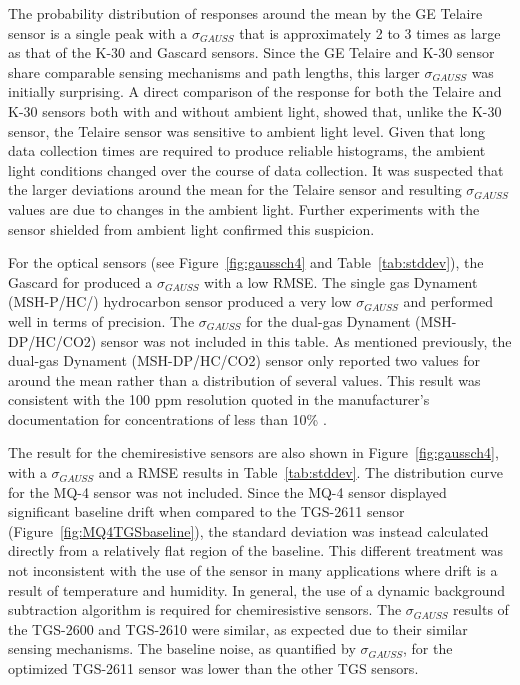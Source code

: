 \documentclass[sensors,article,submit,moreauthors,pdftex]{Definitions/mdpi}
\begin{document}
			
			The probability distribution of responses around the mean by the GE Telaire sensor is a single peak with a $\sigma_{GAUSS}$ that is approximately 2 to 3 times as large as that of the K-30 and Gascard sensors.
			Since the GE Telaire and K-30 sensor share comparable sensing mechanisms and path lengths, this larger $\sigma_{GAUSS}$ was initially surprising.
			A direct comparison of the response for both the Telaire and K-30 sensors both with and without ambient light, showed that, unlike the K-30 sensor, the Telaire sensor was sensitive to ambient light level.
			Given that long data collection times are required to produce reliable histograms, the ambient light conditions changed over the course of data collection.
			It was suspected that the larger deviations around the mean for the Telaire sensor and resulting $\sigma_{GAUSS}$ values are due to changes in the ambient light.
			Further experiments with the sensor shielded from ambient light confirmed this suspicion.
			
			
			For the optical  sensors (see Figure~\ref{fig:gaussch4} and Table~\ref{tab:stddev}), the Gascard for  produced a $\sigma_{GAUSS}$ with a low RMSE.
			The single gas Dynament (MSH-P/HC/) hydrocarbon sensor produced a very low $\sigma_{GAUSS}$ and performed well in terms of precision.
			The $\sigma_{GAUSS}$ for the dual-gas Dynament (MSH-DP/HC/CO2) sensor was not included in this table.
			As mentioned previously, the dual-gas Dynament (MSH-DP/HC/CO2) sensor only reported two values for  around the mean rather than a distribution of several values.
			This result was consistent with the 100 ppm resolution quoted in the manufacturer's documentation for concentrations of less than 10\% .
			

			The result for the chemiresistive  sensors are also shown in Figure~\ref{fig:gaussch4}, with a $\sigma_{GAUSS}$ and a RMSE results in Table~\ref{tab:stddev}.
			The distribution curve for the MQ-4 sensor was not included.
			Since the MQ-4 sensor displayed significant baseline drift when compared to the TGS-2611 sensor (Figure~\ref{fig:MQ4TGSbaseline}), the standard deviation was instead calculated directly from a relatively flat region of the baseline.
			This different treatment was not inconsistent with the use of the sensor in many applications where drift is a result of temperature and humidity.
			In general, the use of a dynamic background subtraction algorithm is required for chemiresistive sensors.
			The $\sigma_{GAUSS}$ results of the TGS-2600 and TGS-2610 were similar, as expected due to their similar sensing mechanisms.
			The baseline noise, as quantified by $\sigma_{GAUSS}$, for the  optimized TGS-2611 sensor was lower than the other TGS sensors.
			
\end{document}
